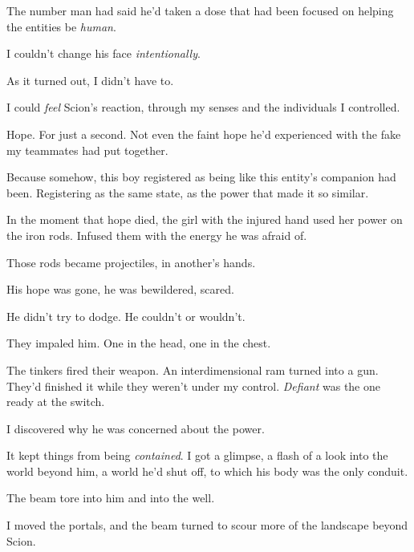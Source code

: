 The number man had said he'd taken a dose that had been focused on helping the entities be \emph{human}.



I couldn't change his face \emph{intentionally}.



As it turned out, I didn't have to.



I could \emph{feel} Scion's reaction, through my senses and the individuals I controlled.



Hope.  For just a second.  Not even the faint hope he'd experienced with the fake my teammates had put together.



Because somehow, this boy registered as being like this entity's companion had been.  Registering as the same state, as the power that made it so similar.



In the moment that hope died, the girl with the injured hand used her power on the iron rods.  Infused them with the energy he was afraid of.



Those rods became projectiles, in another's hands.



His hope was gone, he was bewildered, scared.



He didn't try to dodge.  He couldn't or wouldn't.



They impaled him.  One in the head, one in the chest.



The tinkers fired their weapon.  An interdimensional ram turned into a gun.  They'd finished it while they weren't under my control.  \emph{Defiant} was the one ready at the switch.



I discovered why he was concerned about the power.



It kept things from being \emph{contained}.  I got a glimpse, a flash of a look into the world beyond him, a world he'd shut off, to which his body was the only conduit.



The beam tore into him and into the well.



I moved the portals, and the beam turned to scour more of the landscape beyond Scion.



